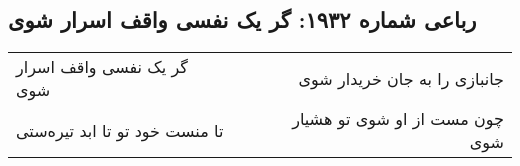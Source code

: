 \begin{center}
\section*{رباعی شماره ۱۹۳۲: گر یک نفسی واقف اسرار شوی}
\label{sec:1932}
\begin{longtable}{l p{0.5cm} r}
گر یک نفسی واقف اسرار شوی
&&
جانبازی را به جان خریدار شوی
\\
تا منست خود تو تا ابد تیره‌ستی
&&
چون مست از او شوی تو هشیار شوی
\\
\end{longtable}
\end{center}
